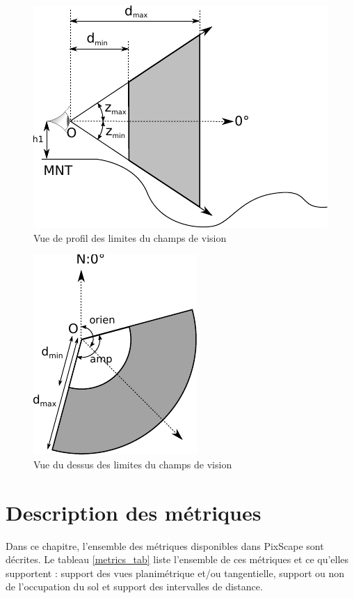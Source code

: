 \documentclass{report}
\begin{document}
\begin{figure}[H]
	\includegraphics{img/bounds_side.pdf} 
	\caption{Vue de profil des limites du champs de vision}
	\label{bounds_side}
\end{figure}

\begin{figure}[H]
	\includegraphics{img/bounds_2d.pdf} 
	\caption{Vue du dessus des limites du champs de vision}
	\label{bounds_2d}
\end{figure}


\chapter{Description des métriques}
\label{metrics}
Dans ce chapitre, l'ensemble des métriques disponibles dans PixScape sont décrites. Le tableau \ref{metrics_tab} liste l'ensemble de ces métriques et ce qu'elles supportent : support des vues planimétrique et/ou tangentielle, support ou non de l'occupation du sol et support des intervalles de distance.
\end{document}
